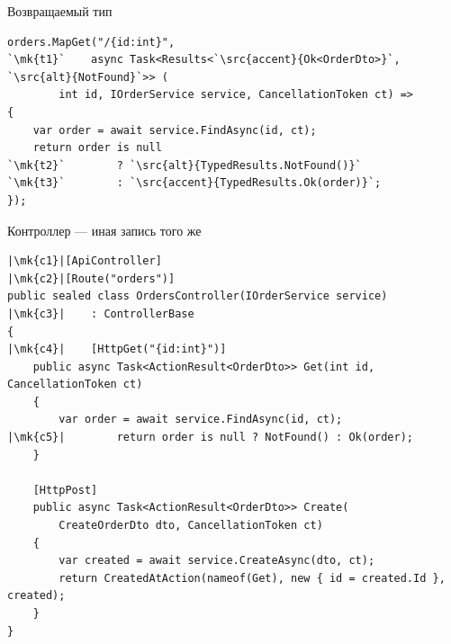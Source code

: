 \documentclass[aspectratio=169,10pt,t]{beamer}
\newcommand{\src}[2]{\textcolor{#1}{\textbf{#2}}}
\newcommand{\codesm}{\ttfamily\fontsize{7.6}{9.0}\selectfont}
\newcommand{\codexxs}{\ttfamily\fontsize{6.8}{7.8}\selectfont}
\newcommand{\mk}[1]{\tikz[remember picture,overlay]\coordinate (#1) at (0,0.55ex);}
\begin{document}
\begin{frame}[fragile]{Возвращаемый тип}
  \slidetop

\begin{lstlisting}[style=csharp,basicstyle=\codesm,escapechar=`]
orders.MapGet("/{id:int}",
`\mk{t1}`    async Task<Results<`\src{accent}{Ok<OrderDto>}`, `\src{alt}{NotFound}`>> (
        int id, IOrderService service, CancellationToken ct) =>
{
    var order = await service.FindAsync(id, ct);
    return order is null
`\mk{t2}`        ? `\src{alt}{TypedResults.NotFound()}`
`\mk{t3}`        : `\src{accent}{TypedResults.Ok(order)}`;
});
\end{lstlisting}

  \slidegap
\end{frame}

\begin{frame}[fragile]{Контроллер --- иная запись того же}
  \vspace{0.3em}
\begin{lstlisting}[style=csharp,basicstyle=\codexxs,escapechar=|]
|\mk{c1}|[ApiController]
|\mk{c2}|[Route("orders")]
public sealed class OrdersController(IOrderService service)
|\mk{c3}|    : ControllerBase
{
|\mk{c4}|    [HttpGet("{id:int}")]
    public async Task<ActionResult<OrderDto>> Get(int id, CancellationToken ct)
    {
        var order = await service.FindAsync(id, ct);
|\mk{c5}|        return order is null ? NotFound() : Ok(order);
    }

    [HttpPost]
    public async Task<ActionResult<OrderDto>> Create(
        CreateOrderDto dto, CancellationToken ct)
    {
        var created = await service.CreateAsync(dto, ct);
        return CreatedAtAction(nameof(Get), new { id = created.Id }, created);
    }
}
\end{lstlisting}
\end{frame}
\end{document}

